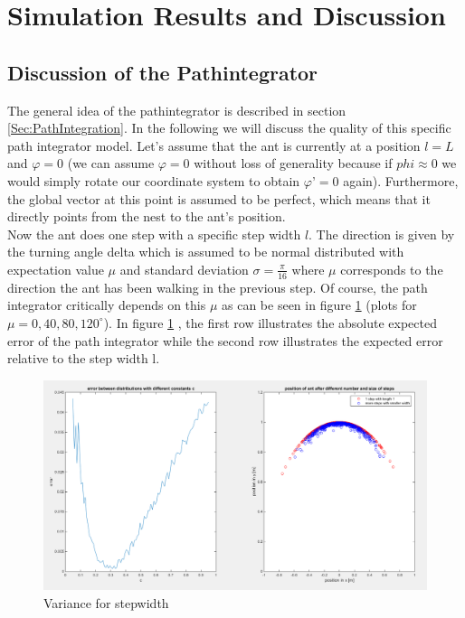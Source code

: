 \documentclass[11pt]{article}
\begin{document}



%

\section{Simulation Results and Discussion}
\subsection{Discussion of the Pathintegrator}
The general idea of the pathintegrator is described in section \ref{Sec:PathIntegration}. In the following we will discuss the quality of this specific path integrator model.
Let’s assume that the ant is currently at a position $l = L$ and $\varphi = 0$ (we can assume $\varphi = 0$ without loss of generality because if $phi \approx 0$ we would simply rotate our coordinate system to obtain $\varphi’ = 0$ again). Furthermore, the global vector at this point is assumed to be perfect, which means that it directly points from the nest to the ant’s position. \\
Now the ant does one step with a specific step width $l$. The direction is given by the turning angle delta which is assumed to be normal distributed with expectation value $\mu$ and standard deviation $\sigma = \frac{\pi}{16}$ where $\mu$ corresponds to the direction the ant has been walking in the previous step. Of course, the path integrator critically depends on this $\mu$ as can be seen in figure \ref{fig:Variance} (plots for $\mu=0,40,80,120^{\circ}$). In figure \ref{fig:Variance} , the first row illustrates the absolute expected error of the path integrator while the second row illustrates the expected error relative to the step width l.

\begin{figure}[H]
\centering
\includegraphics[scale=0.31]{./Pics/VarianceForStepWidth_plot.png} 
\caption{Variance for stepwidth \label{fig:Variance} }
\end{figure} 
\end{document}
